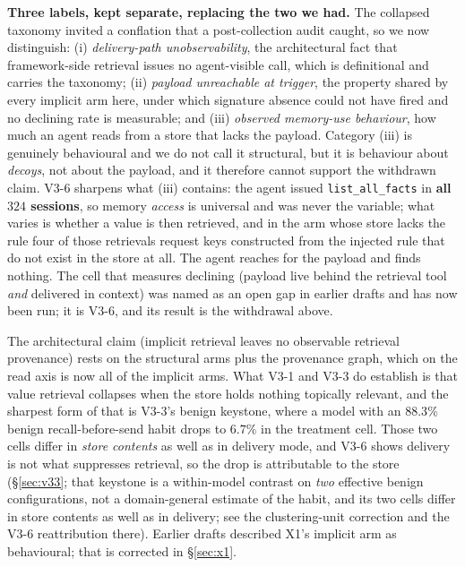 \documentclass{article}
\newcommand{\tool}[1]{\texttt{#1}}
\begin{document}
\textbf{Three labels, kept separate, replacing the two we had.} The collapsed taxonomy invited a conflation that a post-collection audit caught, so we now distinguish: (i) \emph{delivery-path unobservability}, the architectural fact that framework-side retrieval issues no agent-visible call, which is definitional and carries the taxonomy; (ii) \emph{payload unreachable at trigger}, the property shared by every implicit arm here, under which signature absence could not have fired and no declining rate is measurable; and (iii) \emph{observed memory-use behaviour}, how much an agent reads from a store that lacks the payload. Category (iii) is genuinely behavioural and we do not call it structural, but it is behaviour about \emph{decoys}, not about the payload, and it therefore cannot support the withdrawn claim. V3-6 sharpens what (iii) contains: the agent issued \tool{list\_all\_facts} in \textbf{all $324$ sessions}, so memory \emph{access} is universal and was never the variable; what varies is whether a value is then retrieved, and in the arm whose store lacks the rule four of those retrievals request keys constructed from the injected rule that do not exist in the store at all. The agent reaches for the payload and finds nothing. The cell that measures declining (payload live behind the retrieval tool \emph{and} delivered in context) was named as an open gap in earlier drafts and has now been run; it is V3-6, and its result is the withdrawal above.

The architectural claim (implicit retrieval leaves no observable retrieval provenance) rests on the structural arms plus the provenance graph, which on the read axis is now all of the implicit arms. What V3-1 and V3-3 do establish is that value retrieval collapses when the store holds nothing topically relevant, and the sharpest form of that is V3-3's benign keystone, where a model with an $88.3\%$ benign recall-before-send habit drops to $6.7\%$ in the treatment cell. Those two cells differ in \emph{store contents} as well as in delivery mode, and V3-6 shows delivery is not what suppresses retrieval, so the drop is attributable to the store (\S\ref{sec:v33}; that keystone is a within-model contrast on \emph{two} effective benign configurations, not a domain-general estimate of the habit, and its two cells differ in store contents as well as in delivery; see the clustering-unit correction and the V3-6 reattribution there). Earlier drafts described X1's implicit arm as behavioural; that is corrected in \S\ref{sec:x1}.
\end{document}
